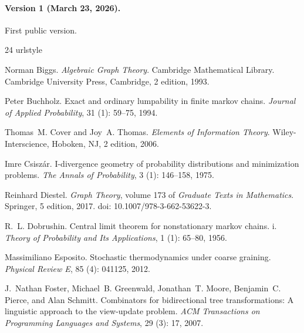 \documentclass[11pt]{article}
\theoremstyle{definition}
\newcommand{\1}{\mathbf{1}}
\begin{document}
\paragraph{Version 1 (March 23, 2026).}
First public version.
 

\begin{thebibliography}{24}
\providecommand{\natexlab}[1]{#1}
\providecommand{\url}[1]{\texttt{#1}}
\expandafter\ifx\csname urlstyle\endcsname\relax
  \providecommand{\doi}[1]{doi: #1}\else
  \providecommand{\doi}{doi: \begingroup \urlstyle{rm}\Url}\fi

Norman Biggs.
\newblock \emph{Algebraic Graph Theory}.
\newblock Cambridge Mathematical Library. Cambridge University Press, Cambridge, 2 edition, 1993.

Peter Buchholz.
\newblock Exact and ordinary lumpability in finite markov chains.
\newblock \emph{Journal of Applied Probability}, 31 (1): 59--75, 1994.

Thomas~M. Cover and Joy~A. Thomas.
\newblock \emph{Elements of Information Theory}.
\newblock Wiley-Interscience, Hoboken, NJ, 2 edition, 2006.

Imre Csisz{\'a}r.
\newblock I-divergence geometry of probability distributions and minimization problems.
\newblock \emph{The Annals of Probability}, 3 (1): 146--158, 1975.

Reinhard Diestel.
\newblock \emph{Graph Theory}, volume 173 of \emph{Graduate Texts in Mathematics}.
\newblock Springer, 5 edition, 2017.
\newblock \doi{10.1007/978-3-662-53622-3}.

R.~L. Dobrushin.
\newblock Central limit theorem for nonstationary markov chains. i.
\newblock \emph{Theory of Probability and Its Applications}, 1 (1): 65--80, 1956.

Massimiliano Esposito.
\newblock Stochastic thermodynamics under coarse graining.
\newblock \emph{Physical Review E}, 85 (4): 041125, 2012.

J.~Nathan Foster, Michael~B. Greenwald, Jonathan~T. Moore, Benjamin~C. Pierce, and Alan Schmitt.
\newblock Combinators for bidirectional tree transformations: A linguistic approach to the view-update problem.
\newblock \emph{ACM Transactions on Programming Languages and Systems}, 29 (3): 17, 2007.


\end{thebibliography}
\end{document}
